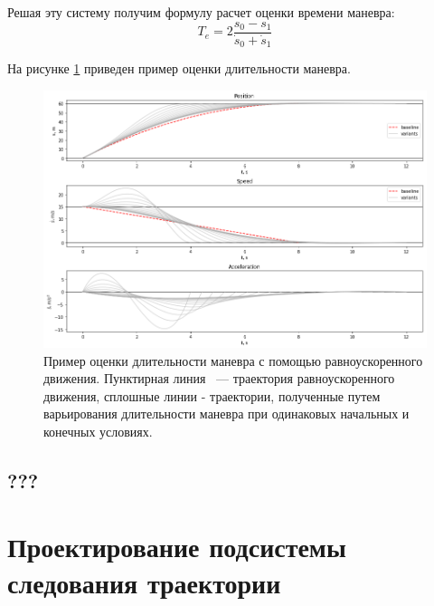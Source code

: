 Решая эту систему получим формулу расчет оценки времени маневра:
\begin{equation}
      T_e = 2\frac{s_0 - s_1}{\dot{s}_0 + \dot{s}_1}
\end{equation}

На рисунке \ref{img:quintic_t_estimate} приведен пример оценки длительности маневра.

\begin{figure}[h]
      \centering
      \includegraphics[width=\linewidth]{images/quintic_t_estimate}
      \caption{Пример оценки длительности маневра с помощью равноускоренного движения. Пунктирная линия ~---
      траектория равноускоренного движения, сплошные линии - траектории, полученные путем варьирования длительности
      маневра при одинаковых начальных и конечных условиях.}
      \label{img:quintic_t_estimate}
\end{figure}

\subsection{???}


\section{Проектирование подсистемы следования траектории}
